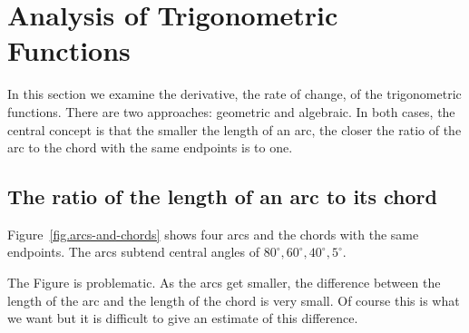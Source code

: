 
\chapter{Analysis of Trigonometric Functions}

In this section we examine the derivative, the rate of change, of the trigonometric functions.
There are two approaches: geometric and algebraic.
In both cases, the central concept is that the smaller the length of an arc, the closer the ratio of the arc to the chord with the same endpoints is to one.

\section{The ratio of the length of an arc to its chord}

Figure~\ref{fig.arcs-and-chords} shows four arcs and the chords with the same endpoints. The arcs subtend central angles of $80^\circ, 60^\circ, 40^\circ, 5^\circ$.

The Figure is problematic. As the arcs get smaller, the difference between the length of the arc and the length of the chord is very small. Of course this is what we want but it is difficult to give an estimate of this difference.

